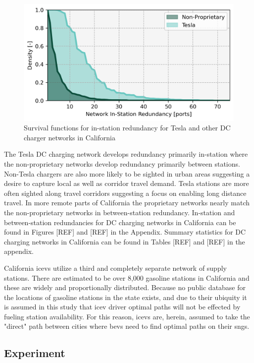 \documentclass[11pt]{article}
\begin{document}
\begin{multicols}{2}
\begin{figure}[H]
	\centering
	\includegraphics[width = \linewidth]{figs/California_RIS_Hist.png}
	\caption{Survival functions for in-station redundancy for Tesla and other DC charger networks in California}
	\label{fig:network_histograms}
\end{figure}

The Tesla DC charging network develops redundancy primarily in-station where the non-proprietary networks develop redundancy primarily between stations. Non-Tesla chargers are also more likely to be sighted in urban areas suggesting a desire to capture local as well as corridor travel demand. Tesla stations are more often sighted along travel corridors suggesting a focus on enabling long distance travel. In more remote parts of California the proprietary networks nearly match the non-proprietary networks in between-station redundancy. In-station and between-station redundancies for DC charging networks in California can be found in Figures [REF] and [REF] in the Appendix. Summary statistics for DC charging networks in California can be found in Tables [REF] and [REF] in the appendix.

California \glspl{icev} utilize a third and completely separate network of supply stations. There are estimated to be over 8,000 gasoline stations in California \cite{CEC_2022} and these are widely and proportionally distributed. Because no public database for the locations of gasoline stations in the state exists, and due to their ubiquity it is assumed in this study that \gls{icev} driver optimal paths will not be effected by fueling station availability. For this reason, \glspl{icev} are, herein, assumed to take the "direct" path between cities where \glspl{bev} need to find optimal paths on their \glspl{sng}.

\subsection*{Experiment}


\end{multicols}
\end{document}
